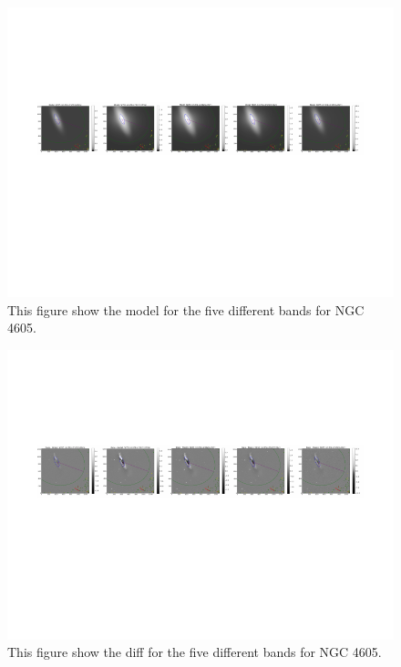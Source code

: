 \documentclass[12pt,preprint,pdftex]{aastex}
\begin{document}
\begin{figure}
\centering
\includegraphics[trim = .9cm 4.5cm 0cm 2.9cm,clip=true,width=\textwidth] {goodsingle-colors-model.pdf}
\caption{This figure show the model for the five different bands for NGC 4605.}
\label{fig:colorsmodel}
\end{figure}

\begin{figure}
\centering
\includegraphics[trim = .9cm 4.5cm 0cm 2.9cm,clip=true,width=\textwidth] {goodsingle-colors-diff.pdf}
\caption{This figure show the diff for the five different bands for NGC 4605.}
\label{fig:colorsdiff}
\end{figure}
\end{document}
